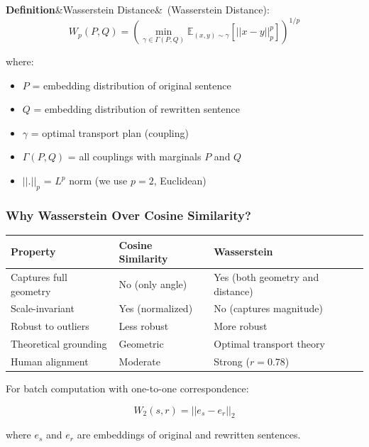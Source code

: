 \documentclass[12pt,a4paper,oneside]{report}
\newenvironment{definition}[1][]{\par\noindent\textbf{Definition}\ifx&#1&\else~(#1)\fi:\quad}{\par}
\begin{document}
\begin{definition}[Wasserstein Distance]
\begin{equation}
W_p(P, Q) = \left(\min_{\gamma \in \Gamma(P,Q)} \mathbb{E}_{(x,y) \sim \gamma}[||x - y||_p^p]\right)^{1/p}
\end{equation}

where:
\begin{itemize}
    \item $P$ = embedding distribution of original sentence
    \item $Q$ = embedding distribution of rewritten sentence
    \item $\gamma$ = optimal transport plan (coupling)
    \item $\Gamma(P,Q)$ = all couplings with marginals $P$ and $Q$
    \item $||.||_p$ = $L^p$ norm (we use $p=2$, Euclidean)
\end{itemize}
\end{definition}

\subsubsection{Why Wasserstein Over Cosine Similarity?}

\begin{table}[H]
\centering
\begin{tabular}{|p{3cm}|p{4cm}|p{4cm}|}
\hline
\textbf{Property} & \textbf{Cosine Similarity} & \textbf{Wasserstein} \\
\hline
Captures full geometry & No (only angle) & Yes (both geometry and distance) \\
\hline
Scale-invariant & Yes (normalized) & No (captures magnitude) \\
\hline
Robust to outliers & Less robust & More robust \\
\hline
Theoretical grounding & Geometric & Optimal transport theory \\
\hline
Human alignment & Moderate & Strong ($r=0.78$) \\
\hline
\end{tabular}
\end{table}

For batch computation with one-to-one correspondence:

\begin{equation}
W_2(s, r) = ||e_s - e_r||_2
\end{equation}

where $e_s$ and $e_r$ are embeddings of original and rewritten sentences.
\end{document}
